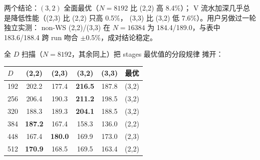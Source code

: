 两个结论：$(3,2)$ 全面最优（$N{=}8192$ 比 (2,2) 高 8.4\%）；
V 流水加深几乎总是降低性能（(2,3) 比 (2,2) 只高 0.5\%，
(3,3) 比 (3,2) 低 7.6\%）。用户另做过一轮独立实测：
non-WS (2,2)/(3,3) 在 $N{=}16384$ 为 184.4/189.0，与表中 183.6/188.4
跨 run 吻合 $\pm$0.5\%，成对结论稳定。

全 $D$ 扫描（$N{=}8192$，其余同上）把 stages 最优值的分段规律
摊开：

\begin{center}
\begin{tabular}{lccccc}
\toprule
$D$ & (2,2) & (2,3) & (3,2) & (3,3) & 最优 \\
\midrule
192 & 202.2 & 177.4 & \textbf{216.5} & 187.8 & (3,2) \\
256 & 206.4 & 190.3 & \textbf{211.2} & 198.5 & (3,2) \\
320 & 188.3 & 189.3 & \textbf{204.1} & 188.5 & (3,2) \\
384 & \textbf{187.2} & 167.4 & 158.3 & 136.0 & (2,2) \\
448 & 167.4 & \textbf{180.0} & 169.9 & 173.0 & (2,3) \\
512 & \textbf{170.9} & 168.5 & 169.5 & 163.4 & (2,2) \\
\bottomrule
\end{tabular}
\end{center}

